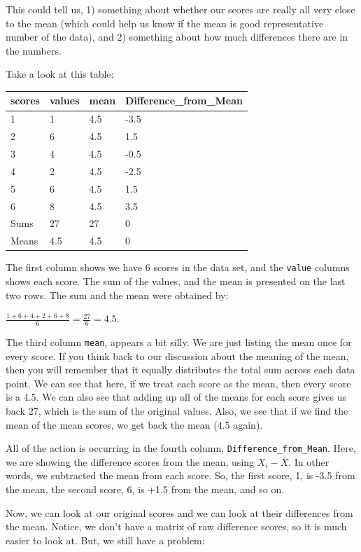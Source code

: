 \documentclass[
]{book}
\begin{document}
This could tell us, 1) something about whether our scores are really all very close to the mean (which could help us know if the mean is good representative number of the data), and 2) something about how much differences there are in the numbers.

Take a look at this table:

\begin{tabular}{l|l|l|l}
\hline
scores & values & mean & Difference\_from\_Mean\\
\hline
1 & 1 & 4.5 & -3.5\\
\hline
2 & 6 & 4.5 & 1.5\\
\hline
3 & 4 & 4.5 & -0.5\\
\hline
4 & 2 & 4.5 & -2.5\\
\hline
5 & 6 & 4.5 & 1.5\\
\hline
6 & 8 & 4.5 & 3.5\\
\hline
Sums & 27 & 27 & 0\\
\hline
Means & 4.5 & 4.5 & 0\\
\hline
\end{tabular}

The first column shows we have 6 scores in the data set, and the \texttt{value} columns shows each score. The sum of the values, and the mean is presented on the last two rows. The sum and the mean were obtained by:

\(\frac{1+6+4+2+6+8}{6} = \frac{27}{6} = 4.5\).

The third column \texttt{mean}, appears a bit silly. We are just listing the mean once for every score. If you think back to our discussion about the meaning of the mean, then you will remember that it equally distributes the total sum across each data point. We can see that here, if we treat each score as the mean, then every score is a 4.5. We can also see that adding up all of the means for each score gives us back 27, which is the sum of the original values. Also, we see that if we find the mean of the mean scores, we get back the mean (4.5 again).

All of the action is occurring in the fourth column, \texttt{Difference\_from\_Mean}. Here, we are showing the difference scores from the mean, using \(X_{i}-\bar{X}\). In other words, we subtracted the mean from each score. So, the first score, 1, is -3.5 from the mean, the second score, 6, is +1.5 from the mean, and so on.

Now, we can look at our original scores and we can look at their differences from the mean. Notice, we don't have a matrix of raw difference scores, so it is much easier to look at. But, we still have a problem:
\end{document}

